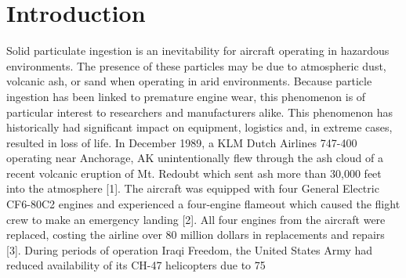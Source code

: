 \documentclass[12pt]{iopart}
\begin{document}
\section{Introduction}
Solid particulate ingestion is an inevitability for aircraft operating in hazardous environments. The presence of these particles may be due to atmospheric dust, volcanic ash, or sand when operating in arid environments. Because particle ingestion has been linked to premature engine wear, this phenomenon is of particular interest to researchers and manufacturers alike. This phenomenon has historically had significant impact on equipment, logistics and, in extreme cases, resulted in loss of life. In December 1989, a KLM Dutch Airlines 747-400 operating near Anchorage, AK unintentionally flew through the ash cloud of a recent volcanic eruption of Mt. Redoubt which sent ash more than 30,000 feet into the atmosphere [1]. The aircraft was equipped with four General Electric CF6-80C2 engines and experienced a four-engine flameout which caused the flight crew to make an emergency landing [2]. All four engines from the aircraft were replaced, costing the airline over 80 million dollars in replacements and repairs [3]. During periods of operation Iraqi Freedom, the United States Army had reduced availability of its CH-47 helicopters due to 75%
\end{document}
